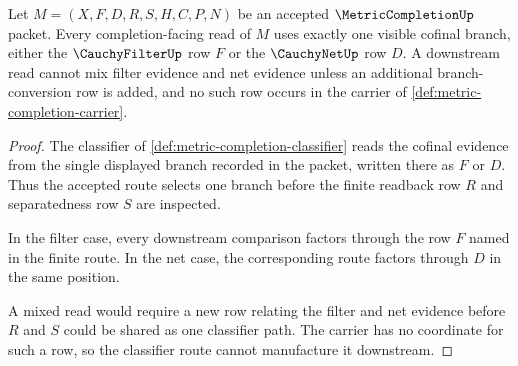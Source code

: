 \begin{theorem}
\label{thm:metric-completion-filter-net-branch-determinacy}
Let $M=(X,F,D,R,S,H,C,P,N)$ be an accepted $\MetricCompletionUp$ packet. Every completion-facing read of $M$ uses exactly one visible cofinal branch, either the $\CauchyFilterUp$ row $F$ or the $\CauchyNetUp$ row $D$. A downstream read cannot mix filter evidence and net evidence unless an additional branch-conversion row is added, and no such row occurs in the carrier of \autoref{def:metric-completion-carrier}.
\end{theorem}
\begin{proof}
The classifier of \autoref{def:metric-completion-classifier} reads the cofinal evidence from the single displayed branch recorded in the packet, written there as $F$ or $D$. Thus the accepted route selects one branch before the finite readback row $R$ and separatedness row $S$ are inspected.

In the filter case, every downstream comparison factors through the row $F$ named in the finite route. In the net case, the corresponding route factors through $D$ in the same position.

A mixed read would require a new row relating the filter and net evidence before $R$ and $S$ could be shared as one classifier path. The carrier has no coordinate for such a row, so the classifier route cannot manufacture it downstream.
\end{proof}

